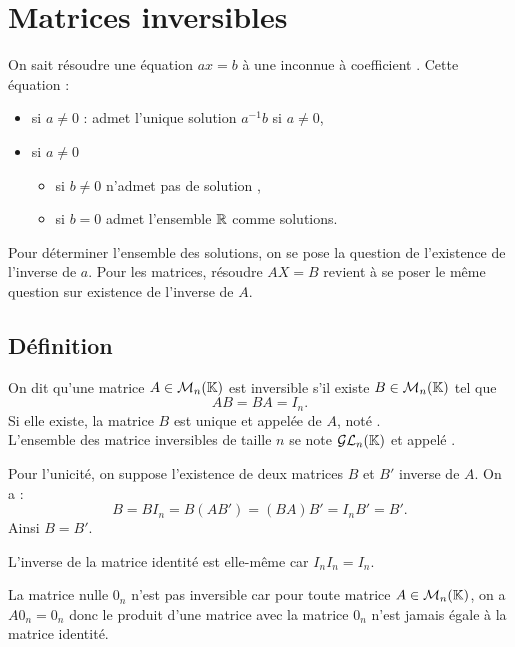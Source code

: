 \documentclass{book}
\begin{document}
\section{Matrices inversibles}
On sait résoudre une équation $a x = b$ à une inconnue à coefficient .   Cette équation  :
\begin{itemize}
\item si $a\neq 0$ : admet l'unique solution $a^{-1}b$ si $a\neq 0$,
\item si $a\neq 0$ 
\begin{itemize}
\item si $b\neq 0$ n'admet pas de solution ,
\item si $b=0$  admet l'ensemble $\mathbb{R}$ comme solutions.
\end{itemize}
\end{itemize}
Pour déterminer l'ensemble des solutions, on se pose la question de l'existence de l'inverse de $a$. Pour les matrices, résoudre $AX = B$ revient à se poser le même question sur  existence de l'inverse de $A$.
\subsection{Définition}
\begin{DefinitionProposition}[Inverse]
On dit qu'une matrice $A\in\mathcal{M}_{n}(\mathbb{K})$ est inversible s'il existe $B\in\mathcal{M}_{n}(\mathbb{K})$ tel que $$AB=BA=I_n.$$ 
Si elle existe, la matrice $B$ est  unique et appelée  de $A$, noté .\\
L'ensemble des matrice inversibles de taille $n$ se note $\mathcal{GL}_n(\mathbb{K})$ et appelé .  
\end{DefinitionProposition}
\begin{Demonstration}
Pour l'unicité, on suppose l'existence de deux matrices $B$ et $B'$ inverse de $A$. On a :
$$ B = BI_n =B(AB')=(BA)B'=I_n B'=B'.$$
Ainsi $B=B'$.
\end{Demonstration}
\begin{Exemple}
L'inverse de la matrice identité est elle-même car $I_nI_n=I_n$.
\end{Exemple}
\begin{Exemple}
La matrice nulle $0_n$ n'est pas inversible car  pour toute matrice $A\in\mathcal{M}_{n}(\mathbb{K})$, on a
$A 0_n = 0_n$ donc le produit d'une matrice avec la matrice $0_n$ n'est jamais égale à la matrice identité.
\end{Exemple}
\end{document}
